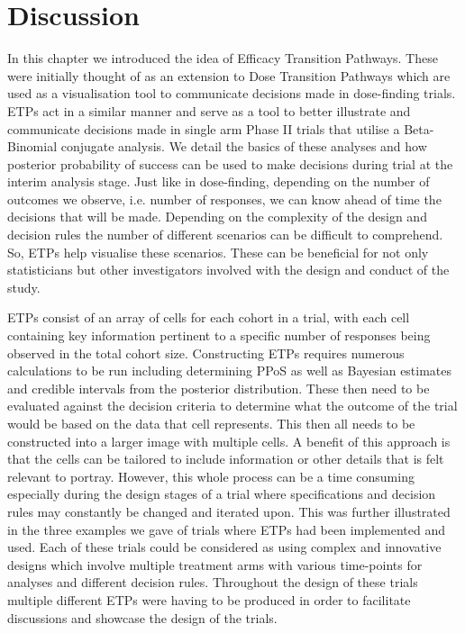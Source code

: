 
\section{Discussion}

In this chapter we introduced the idea of Efficacy Transition Pathways. These were initially thought of as an extension to Dose Transition Pathways which are used as a visualisation tool to communicate decisions made in dose-finding trials. ETPs act in a similar manner and serve as a tool to better illustrate and communicate decisions made in single arm Phase \RN{2} trials that utilise a Beta-Binomial conjugate analysis. We detail the basics of these analyses and how posterior probability of success can be used to make decisions during trial at the interim analysis stage. Just like in dose-finding, depending on the number of outcomes we observe, i.e. number of responses, we can know ahead of time the decisions that will be made. Depending on the complexity of the design and decision rules the number of different scenarios can be difficult to comprehend. So, ETPs help visualise these scenarios. These can be beneficial for not only statisticians but other investigators involved with the design and conduct of the study. 

ETPs consist of an array of cells for each cohort in a trial, with each cell containing key information pertinent to a specific number of responses being observed in the total cohort size. Constructing ETPs requires numerous calculations to be run including determining PPoS as well as Bayesian estimates and credible intervals from the posterior distribution. These then need to be evaluated against the decision criteria to determine what the outcome of the trial would be based on the data that cell represents. This then all needs to be constructed into a larger image with multiple cells. A benefit of this approach is that the cells can be tailored to include information or other details that is felt relevant to portray. However, this whole process can be a time consuming  especially during the design stages of a trial where specifications and decision rules may constantly be changed and iterated upon.   This was further illustrated in the three examples we gave of trials where ETPs had been implemented and used. Each of these trials could be considered as using complex and innovative designs which involve multiple treatment arms with various time-points for analyses and different decision rules. Throughout the design of these trials multiple different ETPs were having to be produced in order to facilitate discussions and showcase the design of the trials. 

